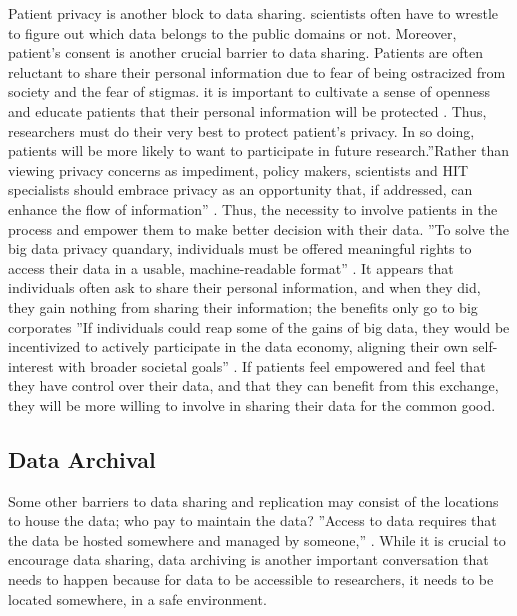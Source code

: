 \documentclass[sigconf]{acmart}
\begin{document}
Patient privacy is another block to data sharing. scientists often have to wrestle to figure out which data belongs to the public domains or not. Moreover, patient's consent is another crucial barrier to data sharing. Patients are often reluctant to share their personal information due to fear of being ostracized from society and the fear of stigmas. it is important to cultivate a sense of openness and educate patients that their personal information will be protected \cite{yozwiak2015data}. Thus, researchers must do their very best to protect patient's privacy. In so doing, patients will be more likely to want to participate in future research.''Rather than viewing privacy concerns as impediment, policy makers, scientists and HIT specialists should embrace privacy as an opportunity that, if addressed, can enhance the flow of information'' \cite{shelton2011electronic}. Thus, the necessity to involve patients in the process and empower them to make better decision with their data. ''To solve the big data privacy quandary, individuals must be offered meaningful rights to access their data in a usable, machine-readable format'' \cite{tene2012big}. It appears that individuals often ask to share their personal information, and when they did, they gain nothing from sharing their information; the benefits only go to big corporates ''If individuals could reap some of the gains of big data, they would be incentivized to actively participate in the data economy, aligning their own self-interest with broader societal goals'' \cite{tene2012big}. If patients feel empowered and feel that they have control over their data, and that they can benefit from this exchange, they will be more willing to involve in sharing their data for the common good.


\subsection{Data Archival}

Some other barriers to data sharing and replication may consist of the locations to house the data; who pay to maintain the data? ''Access to data requires that the data be hosted somewhere and managed by someone,'' \cite{berman2013will}. While it is crucial to encourage data sharing, data archiving is another important conversation that needs to happen because for data to be accessible to researchers, it needs to be located somewhere, in a safe environment. 
\end{document}
